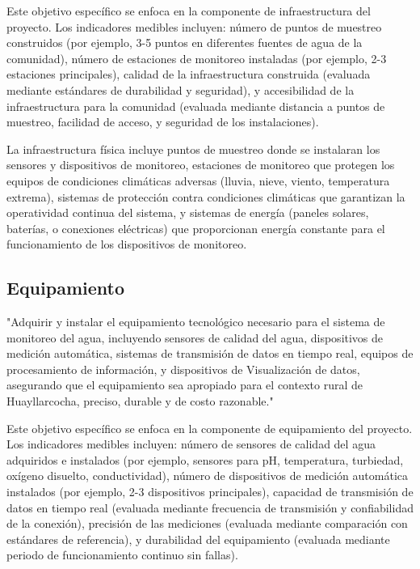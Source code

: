 Este objetivo específico se enfoca en la componente de infraestructura del proyecto. Los indicadores medibles incluyen: número de puntos de muestreo construidos (por ejemplo, 3-5 puntos en diferentes fuentes de agua de la comunidad), número de estaciones de monitoreo instaladas (por ejemplo, 2-3 estaciones principales), calidad de la infraestructura construida (evaluada mediante estándares de durabilidad y seguridad), y accesibilidad de la infraestructura para la comunidad (evaluada mediante distancia a puntos de muestreo, facilidad de acceso, y seguridad de los instalaciones).

La infraestructura física incluye puntos de muestreo donde se instalaran los sensores y dispositivos de monitoreo, estaciones de monitoreo que protegen los equipos de condiciones climáticas adversas (lluvia, nieve, viento, temperatura extrema), sistemas de protección contra condiciones climáticas que garantizan la operatividad continua del sistema, y sistemas de energía (paneles solares, baterías, o conexiones eléctricas) que proporcionan energía constante para el funcionamiento de los dispositivos de monitoreo.

\subsection{Equipamiento}

"Adquirir y instalar el equipamiento tecnológico necesario para el sistema de monitoreo del agua, incluyendo sensores de calidad del agua, dispositivos de medición automática, sistemas de transmisión de datos en tiempo real, equipos de procesamiento de información, y dispositivos de Visualización de datos, asegurando que el equipamiento sea apropiado para el contexto rural de Huayllarcocha, preciso, durable y de costo razonable."

Este objetivo específico se enfoca en la componente de equipamiento del proyecto. Los indicadores medibles incluyen: número de sensores de calidad del agua adquiridos e instalados (por ejemplo, sensores para pH, temperatura, turbiedad, oxígeno disuelto, conductividad), número de dispositivos de medición automática instalados (por ejemplo, 2-3 dispositivos principales), capacidad de transmisión de datos en tiempo real (evaluada mediante frecuencia de transmisión y confiabilidad de la conexión), precisión de las mediciones (evaluada mediante comparación con estándares de referencia), y durabilidad del equipamiento (evaluada mediante periodo de funcionamiento continuo sin fallas).

